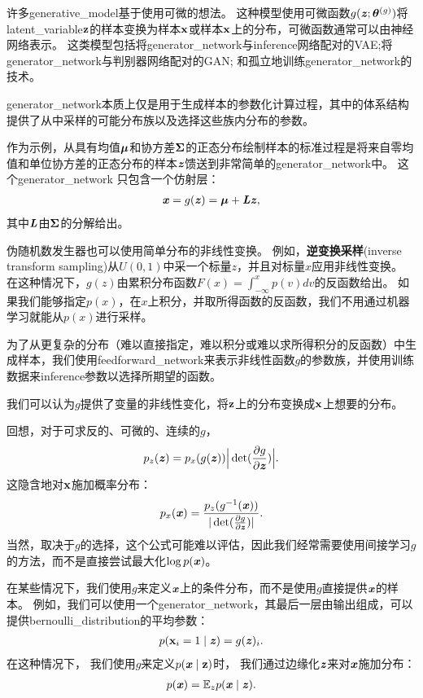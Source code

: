 许多\gls{generative_model}基于使用可微的想法。
这种模型使用可微函数$g(\boldsymbol{\mathit{z}};\boldsymbol{\theta}^{(g)})$将\gls{latent_variable}$\mathbf{z}$的样本变换为样本$\mathbf{x}$或样本$\mathbf{x}$上的分布，可微函数通常可以由神经网络表示。
这类模型包括将\gls{generator_network}与\gls{inference}网络配对的\gls{VAE};将\gls{generator_network}与判别器网络配对的\gls{GAN}; 和孤立地训练\gls{generator_network}的技术。


\gls{generator_network}本质上仅是用于生成样本的参数化计算过程，其中的体系结构提供了从中采样的可能分布族以及选择这些族内分布的参数。

作为示例，从具有均值$\boldsymbol{\mu}$和协方差$\boldsymbol{\Sigma}$的正态分布绘制样本的标准过程是将来自零均值和单位协方差的正态分布的样本$\boldsymbol{\mathit{z}}$馈送到非常简单的\gls{generator_network}中。 这个\gls{generator_network} 只包含一个仿射层：
\begin{align}
 \boldsymbol{\mathit{x}} = g(\boldsymbol{\mathit{z}}) = \boldsymbol{\mu} + \boldsymbol{\mathit{L}} \boldsymbol{\mathit{z}} ,
\end{align}
其中$\boldsymbol{\mathit{L}}$由$\boldsymbol{\Sigma}$的分解给出。


伪随机数发生器也可以使用简单分布的非线性变换。
例如，\textbf{逆变换采样}(inverse transform sampling)\citep{devroye2013non}从$U(0,1)$中采一个标量$z$，并且对标量$x$应用非线性变换。 %
在这种情况下，$g(z)$由累积分布函数$F(x) = \int_{-\infty}^{x} p(v) dv$的反函数给出。
如果我们能够指定$p(x)$，在$x$上积分，并取所得函数的反函数，我们不用通过机器学习就能从$p(x)$进行采样。

为了从更复杂的分布（难以直接指定，难以积分或难以求所得积分的反函数）中生成样本，我们使用\gls{feedforward_network}来表示非线性函数$g$的参数族，并使用训练数据来\gls{inference}参数以选择所期望的函数。

我们可以认为$g$提供了变量的非线性变化，将$\mathbf{z}$上的分布变换成$\mathbf{x}$上想要的分布。

回想，对于可求反的、可微的、连续的$g$，
\begin{align}
 p_z(\boldsymbol{\mathit{z}}) = p_x(g(\boldsymbol{\mathit{z}})) \Big | \det (\frac{\partial g}{\partial \boldsymbol{\mathit{z}}}) \Big |.
\end{align}
这隐含地对$\mathbf{x}$施加概率分布：
\begin{align}
 p_x(\boldsymbol{\mathit{x}}) = \frac{p_z(g^{-1}(\boldsymbol{\mathit{x}}))}{ | \det (\frac{\partial g}{\partial \boldsymbol{\mathit{z}}}) |}.
\end{align}
当然，取决于$g$的选择，这个公式可能难以评估，因此我们经常需要使用间接学习$g$的方法，而不是直接尝试最大化$\log p(\boldsymbol{\mathit{x}})$。

在某些情况下，我们使用$g$来定义$\boldsymbol{\mathit{x}}$上的条件分布，而不是使用$g$直接提供$\boldsymbol{\mathit{x}}$的样本。
例如，我们可以使用一个\gls{generator_network}，其最后一层由输出组成，可以提供\gls{bernoulli_distribution}的平均参数：
\begin{align}
 p(\mathbf{x}_i = 1  \mid  \boldsymbol{\mathit{z}}) = g(\boldsymbol{\mathit{z}})_i .
\end{align}
在这种情况下， 我们使用$g$来定义$p(\boldsymbol{\mathit{x}}  \mid  \mathbf{z})$时， 我们通过边缘化$\boldsymbol{\mathit{z}}$来对$\boldsymbol{\mathit{x}}$施加分布：
\begin{align}
 p(\boldsymbol{\mathit{x}}) = \mathbb{E}_z p(\boldsymbol{\mathit{x}}  \mid  \boldsymbol{\mathit{z}}).
\end{align}

